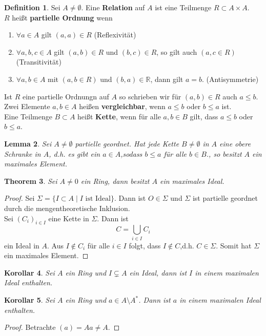 \documentclass[10pt,a4paper]{article}
\newcommand{\R}{\ensuremath{\mathbb{R}}}
\theoremstyle{plain}
\newtheorem{theorem}{Theorem}[section]
\newtheorem{lem}[theorem]{Lemma}
\newtheorem{kor}[theorem]{Korollar}
\theoremstyle{definition}
\newtheorem{definition}[theorem]{Definition}
\theoremstyle{remark}
\begin{document}
	\begin{definition}
		Sei $A\neq\emptyset$. Eine \textbf{Relation} auf $A$ ist eine Teilmenge $R\subset A\times A$.\\
		$R$ heißt \textbf{partielle Ordnung} wenn
		\begin{enumerate}
			\item $\forall a\in A$ gilt $(a,a)\in R$ (Reflexivität)
			\item $\forall a,b,c\in A$ gilt $(a,b)\in R$ und $(b,c)\in R$, so gilt auch $(a,c\in R)$ (Transitivität)
			\item $\forall a,b\in A$ mit $(a,b\in R)$ und $(b,a)\in\R$, dann gilt $a=b$. (Antisymmetrie)
		\end{enumerate}
	
	Ist $R$ eine partielle Ordnungn auf $A$ so schrieben wir für $(a,b)\in R$ auch $a\leq b$.\\
	Zwei Elemente $a,b\in A$ heißen \textbf{vergleichbar}, wenn $a\leq b$ oder $b\leq a$ ist.\\
	Eine Teilmenge $B\subset A$ heißt \textbf{Kette}, wenn für alle $a,b\in B$ gilt, dass $a\leq b$ oder $b\leq a$.
	\end{definition}

	\begin{lem}
		Sei $A\neq \emptyset$ partielle geordnet. Hat jede Kette $B\neq \emptyset$ in $A$ eine obere Schranke in $A$, d.h. es gibt ein $a\in A$,sodass $b\leq a$ für alle $b\in B$., so besitzt $A$ ein maximales Element.
	\end{lem}

	\begin{theorem}
		Sei $A\neq 0$ ein Ring, dann besitzt $A$ ein maximales Ideal.
	\end{theorem}
	\begin{proof}
		Sei $\Sigma=\{I\subset A\mid \text{$I$ ist Ideal}\}$. Dann ist $O\in\Sigma$ und $\Sigma$ ist partielle geordnet durch die mengentheoretische Inklusion.\\
		Sei $(C_i)_{i\in I}$ eine Kette in $\Sigma$. Dann ist
		\[C=\bigcup_{i\in I}C_i\]
		ein Ideal in $A$. Aus $I\notin C_i$ für alle $i\in I$ folgt, dass $I\notin C$,d.h. $C\in\Sigma$. Somit hat $\Sigma$ ein maximales Element.
	\end{proof}

	\begin{kor}
		Sei $A$ ein Ring und $I\subsetneq A$ ein Ideal, dann ist $I$ in einem maximalen Ideal enthalten.
	\end{kor}
	\begin{kor}
		Sei $A$ ein Ring und $a\in A\setminus A^*$. Dann ist $a$ in einem maximalen Ideal enthalten.\\
	\end{kor}
	\begin{proof}
		Betrachte $(a)=Aa\neq A$.
	\end{proof}
\end{document}
